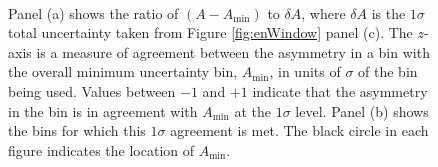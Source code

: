 \begin{figure}[h]
  \centering
   \\
  \caption{Panel (a) shows the ratio of $(A-A_{\mathrm{min}})$ to $\delta A$, where $\delta A$ is the $1\sigma$ total uncertainty
  taken from Figure \ref{fig:enWindow} panel (c). The $z$-axis is a measure of agreement between
  the asymmetry in a bin with the overall minimum uncertainty bin, $A_{\mathrm{min}}$, in units of $\sigma$ of
  the bin being used. Values between $-1$ and $+1$ indicate that the asymmetry in the bin is in agreement with
  $A_{\mathrm{min}}$ at the $1\sigma$ level. Panel (b) shows the bins for which this $1\sigma$ agreement is met. The black
  circle in each figure indicates the location of $A_{\mathrm{min}}$.}
\label{fig:enWindowAsymm}
\end{figure}

